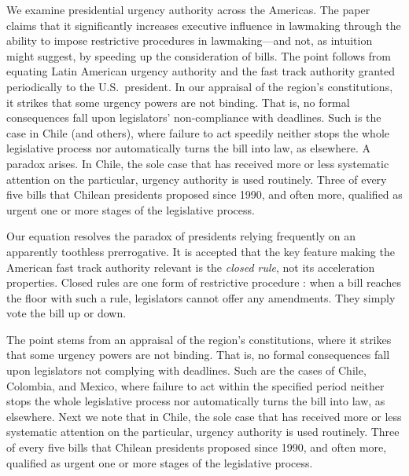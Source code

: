 We examine presidential urgency authority across the Americas. The paper claims that it significantly increases executive influence in lawmaking through the ability to impose restrictive procedures in lawmaking---and not, as intuition might suggest, by speeding up the consideration of bills. The point follows from equating Latin American urgency authority and the fast track authority granted periodically to the U.S.\ president. In our appraisal of the region's constitutions, it strikes that some urgency powers are not binding. That is, no formal consequences fall upon legislators' non-compliance with deadlines. Such is the case in Chile (and others), where failure to act speedily neither stops the whole legislative process nor automatically turns the bill into law, as elsewhere. A paradox arises. In Chile, the sole case that has received more or less systematic attention on the particular, urgency authority is used routinely. Three of every five bills that Chilean presidents proposed since 1990, and often more, qualified as urgent one or more stages of the legislative process.

Our equation resolves the paradox of presidents relying frequently on an apparently toothless prerrogative. It is accepted that the key feature making the American fast track authority relevant is the \emph{closed rule}, not its acceleration properties. Closed rules are one form of restrictive procedure \citep{oleszek.2001}: when a bill reaches the floor with such a rule, legislators cannot offer any amendments. They simply vote the bill up or down. 


The point stems from an appraisal of the region's constitutions, where it strikes that some urgency powers are not binding. That is, no formal consequences fall upon legislators not complying with deadlines. Such are the cases of Chile, Colombia, and Mexico, where failure to act within the specified period neither stops the whole legislative process nor automatically turns the bill into law, as elsewhere. Next we note that in Chile, the sole case that has received more or less systematic attention on the particular, urgency authority is used routinely. Three of every five bills that Chilean presidents proposed since 1990, and often more, qualified as urgent one or more stages of the legislative process.
















